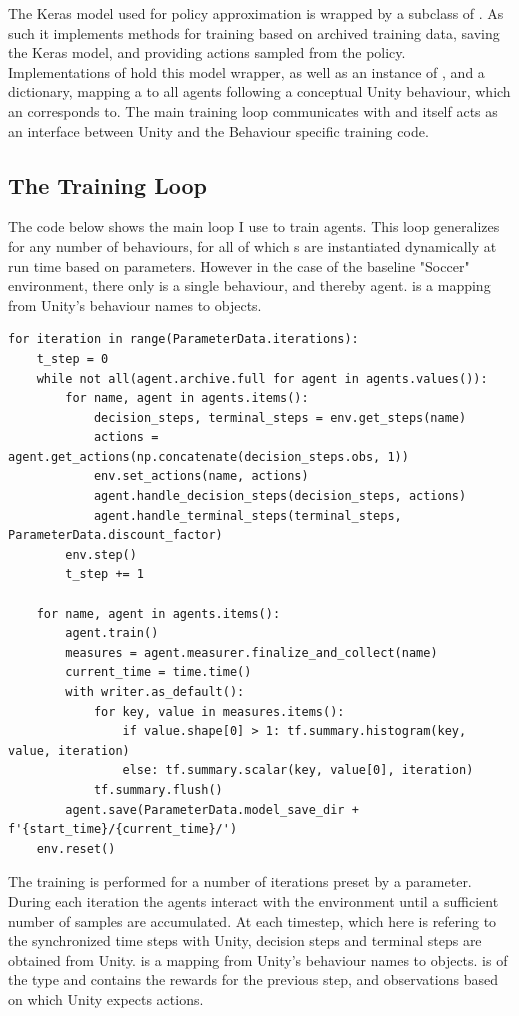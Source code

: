 \noindent
The Keras model used for policy approximation is wrapped by a subclass of . As such it implements methods for training based on archived training data, saving the Keras model, and providing actions sampled from the policy. Implementations of  hold this model wrapper, as well as an instance of , and a dictionary, mapping a  to all agents following a conceptual Unity behaviour, which an  corresponds to. The main training loop communicates with  and itself acts as an interface between Unity and the Behaviour specific training code. 


\subsection{The Training Loop}\label{subsec:ip:tt:training_loop}
The code below shows the main loop I use to train agents. This loop generalizes for any number of behaviours, for all of which s are instantiated dynamically at run time based on parameters. However in the case of the baseline "Soccer" environment, there only is a single behaviour, and thereby agent.  is a mapping from Unity's behaviour names to  objects.
\begin{lstlisting}[basicstyle=\footnotesize]
for iteration in range(ParameterData.iterations):
    t_step = 0
    while not all(agent.archive.full for agent in agents.values()):
        for name, agent in agents.items():
            decision_steps, terminal_steps = env.get_steps(name)
            actions = agent.get_actions(np.concatenate(decision_steps.obs, 1))
            env.set_actions(name, actions)
            agent.handle_decision_steps(decision_steps, actions)
            agent.handle_terminal_steps(terminal_steps, ParameterData.discount_factor)
        env.step()
        t_step += 1
        
    for name, agent in agents.items():
        agent.train()
        measures = agent.measurer.finalize_and_collect(name)
        current_time = time.time()
        with writer.as_default():
            for key, value in measures.items():
                if value.shape[0] > 1: tf.summary.histogram(key, value, iteration)
                else: tf.summary.scalar(key, value[0], iteration)
            tf.summary.flush()
        agent.save(ParameterData.model_save_dir + f'{start_time}/{current_time}/')
    env.reset()
\end{lstlisting}
\noindent
The training is performed for a number of iterations preset by a parameter. During each iteration the agents interact with the environment until a sufficient number of samples are accumulated. At each timestep, which here is refering to the synchronized time steps with Unity, decision steps and terminal steps are obtained from Unity.  is a mapping from Unity's behaviour names to  objects.  is of the type  and contains the rewards for the previous step, and observations based on which Unity expects actions.

